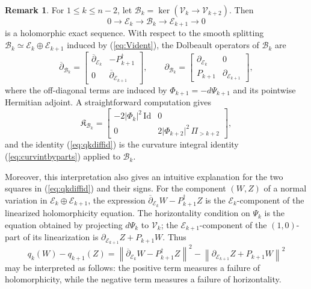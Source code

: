 \documentclass[11pt]{article}
\theoremstyle{definition}
\newtheorem{rmk}[theorem]{Remark}
\numberwithin{equation}{section}
\begin{document}
\begin{rmk}
	For $1\leq k\leq n-2$, let $\mathcal B_k = \ker\left(\mathcal V_k \to \mathcal V_{k+2}\right).$ Then
	\begin{equation*}
		0 \longrightarrow \mathcal E_k \longrightarrow \mathcal B_k \longrightarrow	\mathcal E_{k+1} \longrightarrow 0
	\end{equation*}
	is a holomorphic exact sequence. With respect to the smooth splitting $\mathcal B_k \simeq \mathcal E_k\oplus\mathcal E_{k+1}$ induced by (\ref{eq:Vident}), the Dolbeault operators of $\mathcal{B}_k$ are
	\begin{equation*}
		\overline{\partial}_{\mathcal B_k} = \begin{bmatrix}
		\overline{\partial}_{\mathcal E_k} & -P_{k+1}^\dagger \\
		0 & \overline{\partial}_{\mathcal E_{k+1}}
		\end{bmatrix}, \qquad \partial_{\mathcal B_k} =	\begin{bmatrix}	\partial_{\mathcal E_k} & 0\\
		P_{k+1} & \partial_{\mathcal E_{k+1}}
		\end{bmatrix},
	\end{equation*}
	where the off-diagonal terms are induced by $\Phi_{k+1}=-d\Psi_{k+1}$ and its pointwise Hermitian adjoint. A straightforward computation gives 
	\begin{equation*}
		\mathfrak{K}_{\mathcal{B}_k} = \begin{bmatrix}
		-2 \lvert \Phi_k \rvert^2 \, \mathrm{Id} & 0 \\
		0 & 2 \lvert \Phi_{k+2} \rvert^2 \, \Pi_{>k+2}
		\end{bmatrix},
	\end{equation*}
	and the identity (\ref{eq:qkdiffid}) is the curvature integral identity (\ref{eq:curvintbyparts}) applied to $\mathcal{B}_k.$
			
	Moreover, this interpretation also gives an intuitive explanation for the two squares in (\ref{eq:qkdiffid}) and their signs. For the component $(W,Z)$ of a normal variation in $\mathcal E_k\oplus\mathcal E_{k+1}$, the expression $\overline{\partial}_{\mathcal E_k}W-P^\dagger_{k+1}Z$ is the $\mathcal{E}_k$-component of the linearized holomorphicity equation. The horizontality condition on $\Psi_k$ is the equation obtained by projecting $d\Psi_k$ to $\mathcal V_k$; the $\mathcal{E}_{k+1}$-component of the $(1,0)$-part of its linearization is $\partial_{\mathcal E_{k+1}}Z+P_{k+1}W.$ Thus
	\begin{equation*}
		q_k(W)-q_{k+1}(Z) =	\left\lVert	\overline{\partial}_{\mathcal E_k}W-P^\dagger_{k+1}Z \right\rVert^2 - \left\lVert \partial_{\mathcal E_{k+1}}Z+P_{k+1}W \right\rVert^2
	\end{equation*}
	may be interpreted as follows: the positive term measures a failure of holomorphicity, while the negative term measures a failure of horizontality.
\end{rmk}
\end{document}
